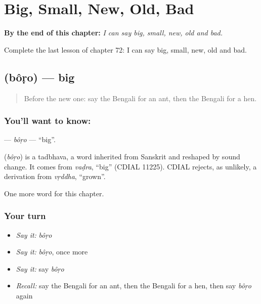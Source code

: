 
\chapter{Big, Small, New, Old, Bad}
\label{ch:bn-big-small-new-old-bad}

\begin{chapteropening}
\textbf{By the end of this chapter:} \emph{I can say big, small, new, old and bad.}

Complete the last lesson of chapter 72: I can say big, small, new, old and bad.
\end{chapteropening}

\section[\texorpdfstring{\bn{বড়} (bôṛo)}{বড় (bôṛo)}]{ (bôṛo) — big}

\label{lesson:BN-C72-boro}



\begin{quote}
Before the new one: say the Bengali for an ant, then the Bengali for a hen.
\end{quote}

\subsection*{You'll want to know: }
\textbf{} — \emph{bôṛo} — \textquotedblleft{}big\textquotedblright{}.

\begin{cousinweb}
\textbf{} (\emph{bôṛo}) is a tadbhava, a word inherited from Sanskrit and reshaped by sound change. It comes from \emph{vaḍra}, \textquotedblleft{}big\textquotedblright{} (CDIAL 11225). CDIAL rejects, as unlikely, a derivation from \emph{vṛddha}, \textquotedblleft{}grown\textquotedblright{}.
\end{cousinweb}

\begin{grammarlens}[title={What you've built}]
One more word for this chapter.
\end{grammarlens}

\subsection*{Your turn}
\begin{itemize}
\raggedright
  \item \emph{Say it:} \emph{bôṛo}
  \item \emph{Say it:} \emph{bôṛo}, once more
  \item \emph{Say it:} say \emph{bôṛo}
  \item \emph{Recall:} say the Bengali for an ant, then the Bengali for a hen, then say \emph{bôṛo} again
\end{itemize}

